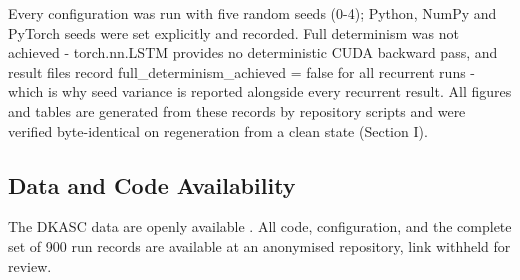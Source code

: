 Every configuration was run with five random seeds (0-4); Python,
NumPy and PyTorch seeds were set explicitly and recorded. Full
determinism was not achieved - torch.nn.LSTM provides no deterministic
CUDA backward pass, and result files record
full\_determinism\_achieved = false for all recurrent runs - which is
why seed variance is reported alongside every recurrent result. All
figures and tables are generated from these records by repository
scripts and were verified byte-identical on regeneration from a clean
state (Section I).

\subsection{Data and Code Availability}
\label{sec:experimental-availability}

The DKASC data are openly available \cite{dkasolarcentre}. All code,
configuration, and the complete set of 900 run records are available
at an anonymised repository, link withheld for review.
